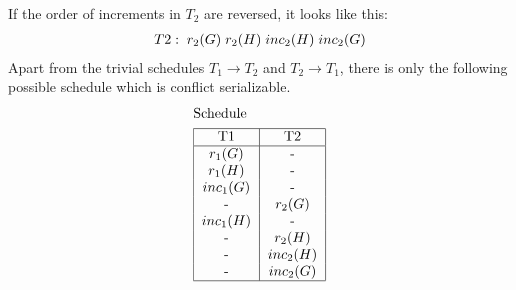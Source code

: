 \begin{parts}
  \begin{solution}[\fullpage]
    If the order of increments in $T_2$ are reversed, it looks
    like this:
    \begin{align}
      T2:\;r_2(G)\; r_2(H)\; inc_2(H)\; inc_2(G) \nonumber 
    \end{align}
    Apart from the trivial schedules $T_1\rightarrow T_2$ and
    $T_2\rightarrow T_1$, there is only the following possible 
    schedule which is conflict serializable.\\
    \begin{align}
      &\text{Schedule} \nonumber \\ 
      &\begin{tabular}{|c|c|}
        \hline
        T1 & T2 \\
        \hline
        $r_1(\va)$ & - \\
        $r_1(\vb)$ & - \\
        $inc_1(\va)$ & - \\
        - & $r_2(\va)$ \\
        $inc_1(\vb)$ & - \\
        - & $r_2(\vb)$ \\
        - & $inc_2(\vb)$ \\
        - & $inc_2(\va)$ \\
        \hline
      \end{tabular} \nonumber
    \end{align}    
  \end{solution}
  
\end{parts}
